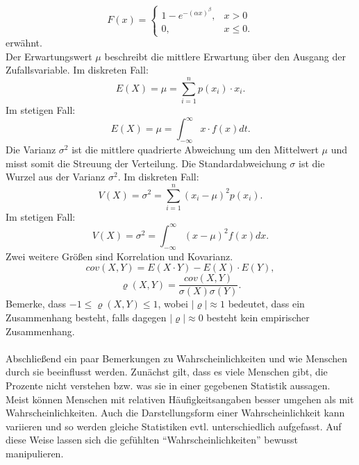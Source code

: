 \[
	F(x) = \left\lbrace
		\begin{array}{ll}
			1-e^{-(\alpha x)^\beta}, & x > 0\\
			0, & x \leq 0.
		\end{array}
	\right.
\]
erwähnt.\\
Der Erwartungswert \(\mu\) beschreibt  die mittlere Erwartung  über den Ausgang der Zufallsvariable. Im diskreten Fall:
\[
	E(X) = \mu = \sum_{i=1}^n p(x_i) \cdot x_i.
\]
Im stetigen Fall:
\[
	E(X) = \mu = \int_{-\infty}^\infty x \cdot f(x) dt.
\]
Die Varianz \(\sigma^2\) ist die mittlere quadrierte Abweichung um den Mittelwert \(\mu\) und misst somit die Streuung der Verteilung.
Die Standardabweichung \(\sigma\) ist die Wurzel aus der Varianz \(\sigma^2\). Im diskreten Fall:
\[
	V(X) = \sigma^2 = \sum_{i=1}^n (x_i-\mu)^2p(x_i).
\]
Im stetigen Fall:
\[
	V(X) = \sigma^2 = \int_{-\infty}^\infty (x-\mu)^2f(x)dx.
\]
Zwei weitere Größen sind Korrelation und Kovarianz.
\[
	cov(X, Y) = E(X \cdot Y) - E(X) \cdot E(Y),
\]
\[
	\varrho(X, Y) = \frac{cov(X, Y)}{\sigma(X)\sigma(Y)}.
\]
Bemerke, dass \(-1 \leq \varrho(X, Y) \leq 1\), wobei \(\left|\varrho\right| \approx 1\) bedeutet, dass ein Zusammenhang besteht, falls dagegen \(\left|\varrho\right| \approx 0 \) besteht kein empirischer Zusammenhang.\\
\ \\
Abschließend ein paar Bemerkungen zu Wahrscheinlichkeiten und wie Menschen durch sie beeinflusst werden. Zunächst gilt, dass es viele Menschen gibt, die Prozente nicht verstehen bzw. was sie in einer gegebenen Statistik aussagen. Meist können Menschen mit relativen Häufigkeitsangaben besser umgehen als mit Wahrscheinlichkeiten. Auch die Darstellungsform einer Wahrscheinlichkeit kann variieren und so werden gleiche Statistiken evtl. unterschiedlich aufgefasst. Auf diese Weise lassen sich die gefühlten ``Wahrscheinlichkeiten'' bewusst manipulieren.
